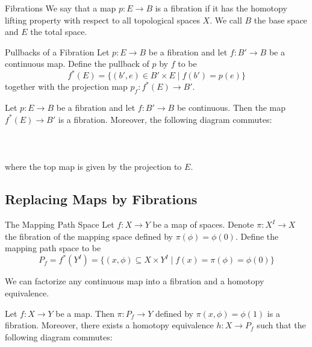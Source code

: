 \documentclass[a4paper]{article}
\begin{document}
\begin{defn}{Fibrations}{} We say that a map $p:E\to B$ is a fibration if it has the homotopy lifting property with respect to all topological spaces $X$. We call $B$ the base space and $E$ the total space. 
\end{defn}

\begin{defn}{Pullbacks of a Fibration}{} Let $p:E\to B$ be a fibration and let $f:B'\to B$ be a continuous map. Define the pullback of $p$ by $f$ to be $$f^\ast(E)=\{(b',e)\in B'\times E\;|\;f(b')=p(e)\}$$ together with the projection map $p_f:f^\ast(E)\to B'$. 
\end{defn}

\begin{prp}{}{} Let $p:E\to B$ be a fibration and let $f:B'\to B$ be continuous. Then the map $f^\ast(E)\to B'$ is a fibration. Moreover, the following diagram commutes: \\~\\
\\~\\
where the top map is given by the projection to $E$. 
\end{prp}

\subsection{Replacing Maps by Fibrations}
\begin{defn}{The Mapping Path Space}{} Let $f:X\to Y$ be a map of spaces. Denote $\pi:X^I\to X$ the fibration of the mapping space defined by $\pi(\phi)=\phi(0)$. Define the mapping path space to be $$P_f=f^\ast(Y^I)=\{(x,\phi)\subseteq X\times Y^I\;|\;f(x)=\pi(\phi)=\phi(0)\}$$
\end{defn}

We can factorize any continuous map into a fibration and a homotopy equivalence. 

\begin{thm}{}{} Let $f:X\to Y$ be a map. Then $\pi:P_f\to Y$ defined by $\pi(x,\phi)=\phi(1)$ is a fibration. Moreover, there exists a homotopy equivalence $h:X\to P_f$ such that the following diagram commutes: \\~\\
\end{thm}
\end{document}

